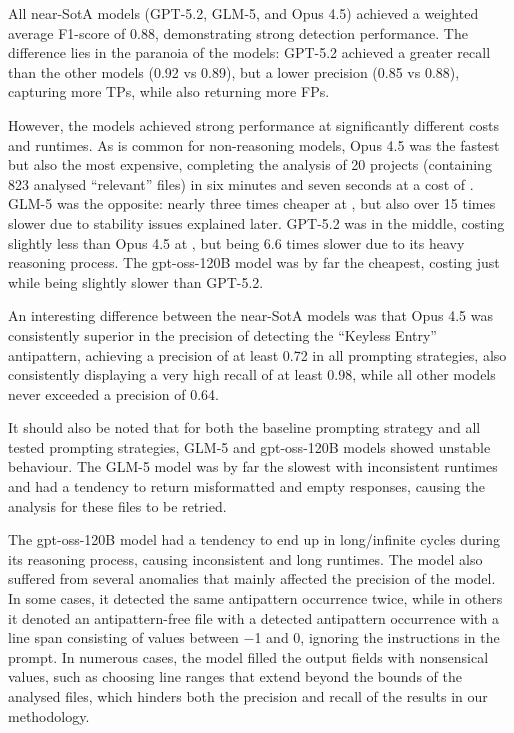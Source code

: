 All near-SotA models (GPT-5.2, GLM-5, and Opus 4.5) achieved a weighted average F1-score of \num{0.88}, demonstrating strong detection performance. The difference lies in the paranoia of the models: GPT-5.2 achieved a greater recall than the other models (\num{0.92} vs \num{0.89}), but a lower precision (\num{0.85} vs \num{0.88}), capturing more TPs, while also returning more FPs.

However, the models achieved strong performance at significantly different costs and runtimes. As is common for non-reasoning models, Opus 4.5 was the fastest but also the most expensive, completing the analysis of \num{20} projects (containing \num{823} analysed “relevant” files) in six minutes and seven seconds at a cost of . GLM-5 was the opposite: nearly three times cheaper at , but also over \num{15} times slower due to stability issues explained later. GPT-5.2 was in the middle, costing slightly less than Opus 4.5 at , but being \num{6.6} times slower due to its heavy reasoning process. The gpt-oss-120B model was by far the cheapest, costing just  while being slightly slower than GPT-5.2.

An interesting difference between the near-SotA models was that Opus 4.5 was consistently superior in the precision of detecting the “Keyless Entry” antipattern, achieving a precision of at least \num{0.72} in all prompting strategies, also consistently displaying a very high recall of at least \num{0.98}, while all other models never exceeded a precision of \num{0.64}.

It should also be noted that for both the baseline prompting strategy and all tested prompting strategies, GLM-5 and gpt-oss-120B models showed unstable behaviour. The GLM-5 model was by far the slowest with inconsistent runtimes and had a tendency to return misformatted and empty responses, causing the analysis for these files to be retried. 

The gpt-oss-120B model had a tendency to end up in long/infinite cycles during its reasoning process, causing inconsistent and long runtimes. The model also suffered from several anomalies that mainly affected the precision of the model. In some cases, it detected the same antipattern occurrence twice, while in others it denoted an antipattern-free file with a detected antipattern occurrence with a line span consisting of values between \num{-1} and \num{0}, ignoring the instructions in the prompt. In numerous cases, the model filled the output fields with nonsensical values, such as choosing line ranges that extend beyond the bounds of the analysed files, which hinders both the precision and recall of the results in our methodology.

